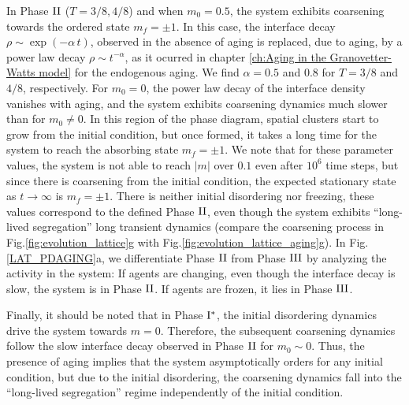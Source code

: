 In Phase ${\rm II}$ ($T=3/8, 4/8$) and when $m_0=0.5$, the system exhibits coarsening towards the ordered state $m_f=\pm 1$. In this case, the interface decay $\rho \sim \exp(-\alpha \, t)$, observed in the absence of aging is replaced, due to aging, by a power law decay $\rho \sim t^{-\alpha}$, as it ocurred in chapter \ref{ch:Aging in the Granovetter-Watts model} for the endogenous aging. We find $\alpha=0.5$ and $0.8$ for $T=3/8$ and $4/8$, respectively. For $m_0=0$, the power law decay of the interface density vanishes with aging, and the system exhibits coarsening dynamics much slower than for $m_0 \neq 0$. In this region of the phase diagram, spatial clusters start to grow from the initial condition, but once formed, it takes a long time for the system to reach the absorbing state $m_f = \pm 1$. 
We note that for these parameter values, the system is not able to reach $|m|$ over $0.1$ even after $10^6$ time steps, but since there is coarsening from the initial condition, the expected stationary state as $t \to \infty$ is $m_f=\pm1$. There is neither initial disordering nor freezing, these values correspond to the defined Phase ${\rm II}$, even though the system exhibits ``long-lived segregation'' long transient dynamics (compare the coarsening process in Fig.\ref{fig:evolution_lattice}g with Fig.\ref{fig:evolution_lattice_aging}g). In Fig. \ref{LAT_PDAGING}a, we differentiate Phase ${\rm II}$ from Phase ${\rm III}$ by analyzing the activity in the system: If agents are changing, even though the interface decay is slow, the system is in Phase ${\rm II}$. If agents are frozen, it lies in Phase ${\rm III}$. %

Finally, it should be noted that in Phase ${\rm I}^{*}$, the initial disordering dynamics drive the system towards $m=0$. Therefore, the subsequent coarsening dynamics follow the slow interface decay observed in Phase ${\rm II}$ for $m_0 \sim 0$. Thus, the presence of aging implies that the system asymptotically orders for any initial condition, but due to the initial disordering, the coarsening dynamics fall into the ``long-lived segregation'' regime independently of the initial condition. 

